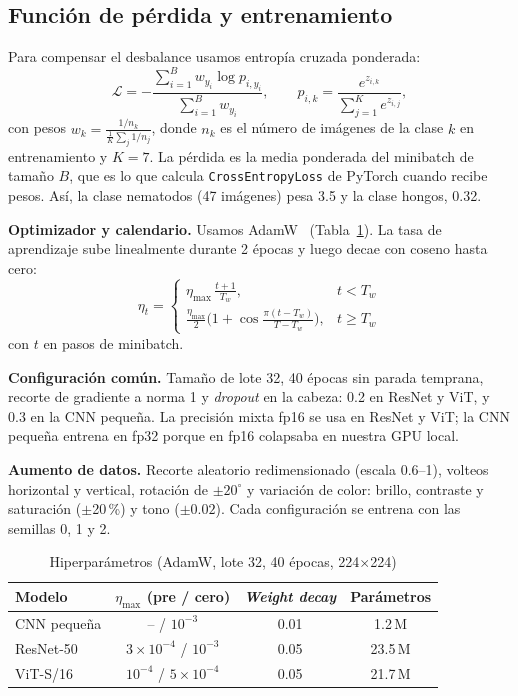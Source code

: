 \documentclass[conference,a4paper]{IEEEtran}
\begin{document}
\subsection{Función de pérdida y entrenamiento}
Para compensar el desbalance usamos entropía cruzada ponderada:
\begin{equation}
\mathcal{L}=-\frac{\sum_{i=1}^{B} w_{y_i}\log p_{i,y_i}}{\sum_{i=1}^{B} w_{y_i}},\qquad
p_{i,k}=\frac{e^{z_{i,k}}}{\sum_{j=1}^{K}e^{z_{i,j}}},
\end{equation}
con pesos $w_k=\frac{1/n_k}{\frac{1}{K}\sum_{j}1/n_j}$, donde $n_k$ es el número de imágenes de la clase $k$ en entrenamiento y $K=7$. La pérdida es la media ponderada del minibatch de tamaño $B$, que es lo que calcula \texttt{CrossEntropyLoss} de PyTorch cuando recibe pesos. Así, la clase nematodos (47 imágenes) pesa 3.5 y la clase hongos, 0.32.

\textbf{Optimizador y calendario.} Usamos AdamW~\cite{loshchilov2019adamw} (Tabla~\ref{tab:hp}). La tasa de aprendizaje sube linealmente durante 2 épocas y luego decae con coseno hasta cero:
\begin{equation}
\eta_t=\begin{cases}\eta_{\max}\,\frac{t+1}{T_w}, & t<T_w\\[2pt]
\frac{\eta_{\max}}{2}\Big(1+\cos\frac{\pi(t-T_w)}{T-T_w}\Big), & t\geq T_w\end{cases}
\end{equation}
con $t$ en pasos de minibatch.

\textbf{Configuración común.} Tamaño de lote 32, 40 épocas sin parada temprana, recorte de gradiente a norma 1 y \textit{dropout} en la cabeza: 0.2 en ResNet y ViT, y 0.3 en la CNN pequeña. La precisión mixta fp16 se usa en ResNet y ViT; la CNN pequeña entrena en fp32 porque en fp16 colapsaba en nuestra GPU local.

\textbf{Aumento de datos.} Recorte aleatorio redimensionado (escala 0.6--1), volteos horizontal y vertical, rotación de $\pm20^\circ$ y variación de color: brillo, contraste y saturación ($\pm$20\,\%) y tono ($\pm0.02$). Cada configuración se entrena con las semillas 0, 1 y 2.

\begin{table}[t]
\caption{Hiperparámetros (AdamW, lote 32, 40 épocas, 224$\times$224)}
\label{tab:hp}
\centering\small
\begin{tabular}{lccc}
\toprule
Modelo & $\eta_{\max}$ (pre / cero) & \textit{Weight decay} & Parámetros \\
\midrule
CNN pequeña & -- / $10^{-3}$ & 0.01 & 1.2\,M \\
ResNet-50 & $3{\times}10^{-4}$ / $10^{-3}$ & 0.05 & 23.5\,M \\
ViT-S/16 & $10^{-4}$ / $5{\times}10^{-4}$ & 0.05 & 21.7\,M \\
\bottomrule
\end{tabular}
\end{table}
\end{document}

